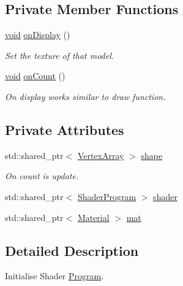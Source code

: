 \subsection*{Private Member Functions}
\begin{DoxyCompactItemize}
\item 
\mbox{\hyperlink{_s_d_l__opengles2__gl2ext_8h_ae5d8fa23ad07c48bb609509eae494c95}{void}} \mbox{\hyperlink{class_aspect_1_1_engine_1_1_mesh_render_aed81ecbd6bf1d63acb06171f729e4927}{on\+Display}} ()
\begin{DoxyCompactList}\small\item\em Set the texture of that model. \end{DoxyCompactList}\item 
\mbox{\hyperlink{_s_d_l__opengles2__gl2ext_8h_ae5d8fa23ad07c48bb609509eae494c95}{void}} \mbox{\hyperlink{class_aspect_1_1_engine_1_1_mesh_render_aebaa5a60d373d3363a13336cfbaa4141}{on\+Count}} ()
\begin{DoxyCompactList}\small\item\em On display works similar to draw function. \end{DoxyCompactList}\end{DoxyCompactItemize}
\subsection*{Private Attributes}
\begin{DoxyCompactItemize}
\item 
std\+::shared\+\_\+ptr$<$ \mbox{\hyperlink{class_aspect_1_1_engine_1_1_vertex_array}{Vertex\+Array}} $>$ \mbox{\hyperlink{class_aspect_1_1_engine_1_1_mesh_render_af137747f679a92eec890a25cbdbc9e8a}{shape}}
\begin{DoxyCompactList}\small\item\em On count is update. \end{DoxyCompactList}\item 
std\+::shared\+\_\+ptr$<$ \mbox{\hyperlink{class_aspect_1_1_engine_1_1_shader_program}{Shader\+Program}} $>$ \mbox{\hyperlink{class_aspect_1_1_engine_1_1_mesh_render_af49c803c0ee4b4e72e8d87455e74ae5e}{shader}}
\item 
std\+::shared\+\_\+ptr$<$ \mbox{\hyperlink{class_aspect_1_1_engine_1_1_material}{Material}} $>$ \mbox{\hyperlink{class_aspect_1_1_engine_1_1_mesh_render_ad1db374346473ead0d1c8c1801390dbe}{mat}}
\end{DoxyCompactItemize}


\subsection{Detailed Description}
Initialise Shader \mbox{\hyperlink{class_aspect_1_1_engine_1_1_program}{Program}}. 

